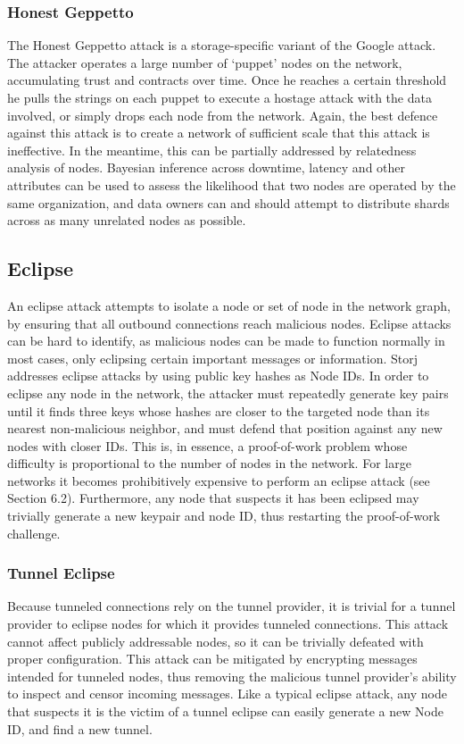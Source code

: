 \documentclass[a4paper,10pt]{article}
\begin{document}
\subsubsection{Honest Geppetto}
The Honest Geppetto attack is a storage-specific variant of the Google attack. The attacker operates a large number of ‘puppet’ nodes on the network, accumulating trust and contracts over time. Once he reaches a certain threshold he pulls the strings on each puppet to execute a hostage attack with the data involved, or simply drops each node from the network. Again, the best defence against this attack is to create a network of sufficient scale that this attack is ineffective. In the meantime, this can be partially addressed by relatedness analysis of nodes. Bayesian inference across downtime, latency and other attributes can be used to assess the likelihood that two nodes are operated by the same organization, and data owners can and should attempt to distribute shards across as many unrelated nodes as possible.

\subsection{Eclipse}
An eclipse attack attempts to isolate a node or set of node in the network graph, by ensuring that all outbound connections reach malicious nodes. Eclipse attacks can be hard to identify, as malicious nodes can be made to function normally in most cases, only eclipsing certain important messages or information. Storj addresses eclipse attacks by using public key hashes as Node IDs. In order to eclipse any node in the network, the attacker must repeatedly generate key pairs until it finds three keys whose hashes are closer to the targeted node than its nearest non-malicious neighbor, and must defend that position against any new nodes with closer IDs. This is, in essence, a proof-of-work problem whose difficulty is proportional to the number of nodes in the network. For large networks it becomes prohibitively expensive to perform an eclipse attack (see Section 6.2). Furthermore, any node that suspects it has been eclipsed may trivially generate a new keypair and node ID, thus restarting the proof-of-work challenge.

\subsubsection{Tunnel Eclipse}
Because tunneled connections rely on the tunnel provider, it is trivial for a tunnel provider to eclipse nodes for which it provides tunneled connections. This attack cannot affect publicly addressable nodes, so it can be trivially defeated with proper configuration. This attack can be mitigated by encrypting messages intended for tunneled nodes, thus removing the malicious tunnel provider's ability to inspect and censor incoming messages. Like a typical eclipse attack, any node that suspects it is the victim of a tunnel eclipse can easily generate a new Node ID, and find a new tunnel.
\end{document}
